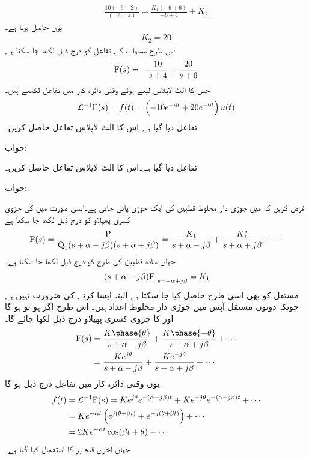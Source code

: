 \begin{align*}
\frac{10(-6+2)}{(-6+4)}=\frac{K_1(-6+6)}{-6+4}+K_2
\end{align*}
یوں  حاصل ہوتا ہے۔
\begin{align*}
K_2=20
\end{align*}
اس طرح مساوات  کے تفاعل کو درج ذیل لکھا جا سکتا ہے
\begin{align*}
{\ensuremath{{\textup{F}}}}(s)=-\frac{10}{s+4}+\frac{20}{s+6}
\end{align*}
جس کا الٹ لاپلاس لیتے ہوئے وقتی دائرہ کار میں تفاعل لکھتے ہیں۔
\begin{align*}
\mathcal{L}^{-1} {{\textup{F}}}(s)=f(t)=\left(-10e^{-4t}+20e^{-6t}\right)u(t)
\end{align*}
تفاعل  دیا گیا ہے۔اس کا الٹ لاپلاس تفاعل حاصل کریں۔

جواب:

تفاعل  دیا گیا ہے۔اس کا الٹ لاپلاس تفاعل حاصل کریں۔

جواب:

فرض کریں کہ  میں جوڑی دار مخلوط قطبین کی ایک جوڑی پائی جاتی ہے۔ایسی صورت میں  کی جزوی کسری پھیلاو کو درج ذیل لکھا جا سکتا ہے
\begin{align*}
{\ensuremath{{\textup{F}}}}(s)=\frac{{{\textup{P}}}}{{{\textup{Q}}}_1 (s+\alpha-j\beta)(s+\alpha+j\beta)}=\frac{K_1}{s+\alpha-j\beta}+\frac{K^*_1}{s+\alpha+j\beta}+\cdots
\end{align*}
جہاں سادہ قطبین کی طرح  کو درج ذیل لکھا جا سکتا ہے۔
\begin{align}
\left. (s+\alpha-j\beta){{\textup{F}}}\right|_{s=-\alpha+j\beta}=K_1
\end{align}
مستقل  کو بھی اسی طرح حاصل کیا جا سکتا ہے البتہ ایسا کرنے کی ضرورت نہیں ہے چونکہ دونوں مستقل آپس میں جوڑی دار مخلوط اعداد ہیں۔ اس طرح اگر  ہو تو  ہو گا اور  کا جزوی کسری پھیلاو درج ذیل لکھا جائے گا۔
\begin{align*}
\bF(s)&=\frac{K\phase{\theta}}{s+\alpha-j\beta}+\frac{K\phase{-\theta}}{s+\alpha+j\beta}+\cdots\\
&=\frac{Ke^{j\theta}}{s+\alpha-j\beta}+\frac{Ke^{-j\theta}}{s+\alpha+j\beta}+\cdots
\end{align*}
یوں وقتی دائرہ کار میں تفاعل درج ذیل ہو گا
\begin{align*}
f(t)&=\mathcal{L}^{-1}{{\textup{F}}}(s)=Ke^{j\theta}e^{-(\alpha-j\beta)t}+Ke^{-j\theta}e^{-(\alpha+j\beta)t}+\cdots\\
&=Ke^{-\alpha t}\left(e^{j(\theta+\beta t)}+e^{-j(\theta+\beta t)}\right)+\cdots\\
&=2Ke^{-\alpha t}\cos(\beta t+\theta)+\cdots
\end{align*}
جہاں آخری قدم پر  کا استعمال کیا گیا ہے۔


